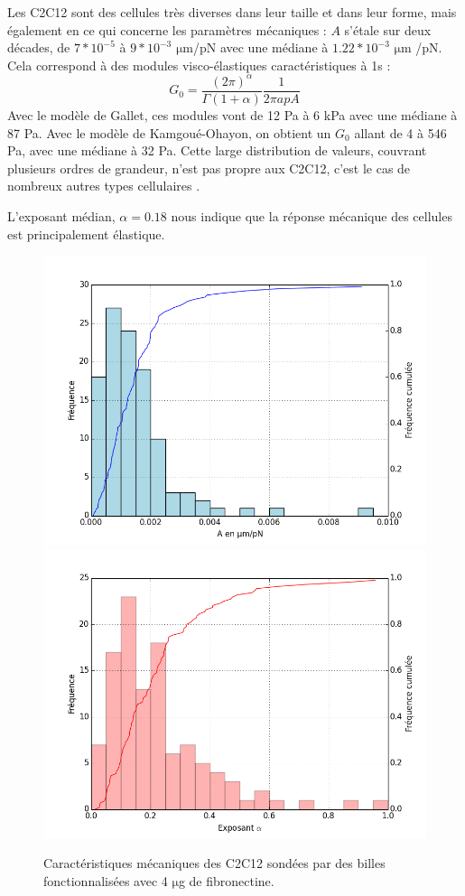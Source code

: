 \documentclass{report}
\newcommand{\micro}{$\mathrm{\mu}$}
\begin{document}
Les C2C12 sont des cellules très diverses dans leur taille et dans leur forme, mais également en ce qui concerne les paramètres mécaniques : $A$ s'étale sur deux décades, de $7*10^{-5}$ à $9* 10^{-3}$ \micro m/pN avec une médiane à $1.22 * 10^{-3}$ \micro m /pN.  Cela correspond à des modules visco-élastiques caractéristiques à 1s : 
$$G_0 = \frac{(2 \pi)^{\alpha}}{\Gamma(1+\alpha)} \frac{1}{2 \pi a p A}$$ 
Avec le modèle de Gallet, ces modules vont de 12 Pa à 6 kPa avec une médiane à 87 Pa. 
Avec le modèle de Kamgoué-Ohayon, on obtient un $G_0$ allant de 4 à 546 Pa, avec une médiane à 32 Pa. Cette large distribution de valeurs, couvrant plusieurs ordres de grandeur, n'est pas propre aux C2C12, c'est le cas de nombreux autres types cellulaires \parencite{balland_dissipative_2005}. 

L'exposant médian, $\alpha=0.18$ nous indique que la réponse mécanique des cellules est principalement élastique.


\begin{figure}
\includegraphics[scale=0.5]{Figures/A0_Toutes.png} 
\includegraphics[scale=0.5]{Figures/E0_Toutes.png} 
\caption{Caractéristiques mécaniques des C2C12 sondées par des billes fonctionnalisées avec 4 \micro g de fibronectine.}
\end{figure}
 
\end{document}
